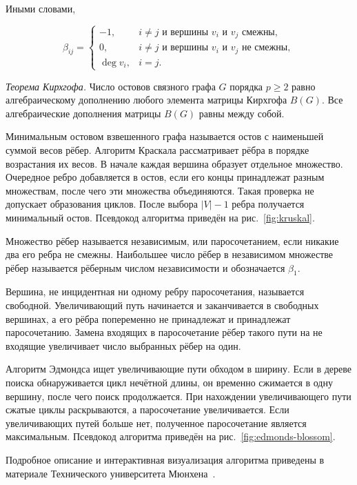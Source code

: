 Иными словами,

\[
\beta_{ij}=
\begin{cases}
-1, & i\neq j \text{ и вершины } v_i \text{ и } v_j \text{ смежны},\\
0, & i\neq j \text{ и вершины } v_i \text{ и } v_j \text{ не смежны},\\
\deg v_i, & i=j.
\end{cases}
\]

\textit{Теорема Кирхгофа.} Число остовов связного графа $G$ порядка $p\geq2$ равно алгебраическому дополнению любого элемента матрицы Кирхгофа $B(G)$. Все алгебраические дополнения матрицы $B(G)$ равны между собой.

Минимальным остовом взвешенного графа называется остов с наименьшей суммой весов рёбер. Алгоритм Краскала рассматривает рёбра в порядке возрастания их весов. В начале каждая вершина образует отдельное множество. Очередное ребро добавляется в остов, если его концы принадлежат разным множествам, после чего эти множества объединяются. Такая проверка не допускает образования циклов. После выбора $|V|-1$ ребра получается минимальный остов. Псевдокод алгоритма приведён на рис.~\ref{fig:kruskal}.


Множество рёбер называется независимым, или паросочетанием, если никакие два его ребра не смежны. Наибольшее число рёбер в независимом множестве рёбер называется рёберным числом независимости и обозначается $\beta_{1}$.

Вершина, не инцидентная ни одному ребру паросочетания, называется свободной. Увеличивающий путь начинается и заканчивается в свободных вершинах, а его рёбра попеременно не принадлежат и принадлежат паросочетанию. Замена входящих в паросочетание рёбер такого пути на не входящие увеличивает число выбранных рёбер на один.

Алгоритм Эдмондса ищет увеличивающие пути обходом в ширину. Если в дереве поиска обнаруживается цикл нечётной длины, он временно сжимается в одну вершину, после чего поиск продолжается. При нахождении увеличивающего пути сжатые циклы раскрываются, а паросочетание увеличивается. Если увеличивающих путей больше нет, полученное паросочетание является максимальным. Псевдокод алгоритма приведён на рис.~\ref{fig:edmonds-blossom}.

Подробное описание и интерактивная визуализация алгоритма приведены в материале Технического университета Мюнхена~\cite{tum-blossom}.

